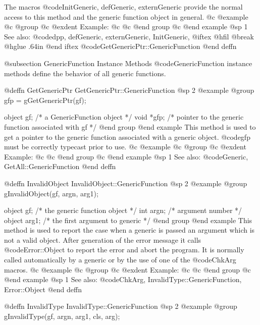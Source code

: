 The macros @code{InitGeneric, defGeneric, externGeneric} provide the
normal access to this method and the generic function object in general.
@c @example
@c @group
@c @exdent Example:
@c 
@c @end group
@c @end example
@sp 1
See also:  @code{dpp, defGeneric, externGeneric, InitGeneric,}
@iftex
@hfil @break @hglue .64in    
@end iftex
@code{GetGenericPtr::GenericFunction}
@end deffn






@subsection GenericFunction Instance Methods
@code{GenericFunction} instance methods define the behavior of all generic
functions.






@deffn {GetGenericPtr} GetGenericPtr::GenericFunction
@sp 2
@example
@group
gfp = gGetGenericPtr(gf);

object  gf;     /*  a GenericFunction object  */
void    *gfp;   /*  pointer to the generic function
                    associated with gf  */
@end group
@end example
This method is used to get a pointer to the generic function
associated with a generic object.  @code{gfp} must be correctly
typecast prior to use.
@c @example
@c @group
@c @exdent Example:
@c 
@c @end group
@c @end example
@sp 1
See also:  @code{Generic, GetAll::GenericFunction}
@end deffn








@deffn {InvalidObject} InvalidObject::GenericFunction
@sp 2
@example
@group
gInvalidObject(gf, argn, arg1);

object  gf;     /*  the generic function object  */
int     argn;   /*  argument number  */
object  arg1;   /*  the first argument to generic  */
@end group
@end example
This method is used to report the case when a generic is passed an
argument which is not a valid object.  After generation of the error
message it calls @code{Error::Object} to report the error and abort the
program.  It is normally called automatically by a generic or by the use
of one of the @code{ChkArg} macros.
@c @example
@c @group
@c @exdent Example:
@c 
@c @end group
@c @end example
@sp 1
See also:  @code{ChkArg, InvalidType::GenericFunction, Error::Object}
@end deffn








@deffn {InvalidType} InvalidType::GenericFunction
@sp 2
@example
@group
gInvalidType(gf, argn, arg1, cls, arg);

